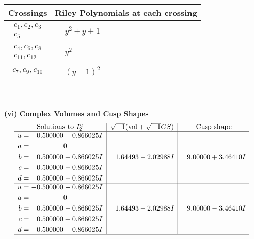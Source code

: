 \documentclass[1p]{elsarticle_modified}
\theoremstyle{definition}
\newcommand{\I}{\sqrt{-1}}
\begin{document}
\begin{tabular}{m{50pt}|m{274pt}}
Crossings & \hspace{64pt}Riley Polynomials at each crossing \\
\hline $$\begin{aligned}c_{1},c_{2},c_{3}\\c_{5}\end{aligned}$$&$\begin{aligned}
&y^2+y+1
\end{aligned}$\\
\hline $$\begin{aligned}c_{4},c_{6},c_{8}\\c_{11},c_{12}\end{aligned}$$&$\begin{aligned}
&y^2
\end{aligned}$\\
\hline $$\begin{aligned}c_{7},c_{9},c_{10}\end{aligned}$$&$\begin{aligned}
&(y-1)^2
\end{aligned}$\\
\hline
\end{tabular}\\~\\
\newpage\flushleft \textbf{(vi) Complex Volumes and Cusp Shapes}
$$\begin{array}{c|c|c}  
\text{Solutions to }I^u_{2}& \I (\text{vol} + \sqrt{-1}CS) & \text{Cusp shape}\\
 \hline 
\begin{aligned}
u &= -0.500000 + 0.866025 I \\
a &= \phantom{-0.000000 } 0 \\
b &= \phantom{-}0.500000 + 0.866025 I \\
c &= \phantom{-}0.500000 - 0.866025 I \\
d &= \phantom{-}0.500000 - 0.866025 I\end{aligned}
 & \phantom{-}1.64493 - 2.02988 I & \phantom{-}9.00000 + 3.46410 I \\ \hline\begin{aligned}
u &= -0.500000 - 0.866025 I \\
a &= \phantom{-0.000000 } 0 \\
b &= \phantom{-}0.500000 - 0.866025 I \\
c &= \phantom{-}0.500000 + 0.866025 I \\
d &= \phantom{-}0.500000 + 0.866025 I\end{aligned}
 & \phantom{-}1.64493 + 2.02988 I & \phantom{-}9.00000 - 3.46410 I\\
 \hline 
 \end{array}$$\newpage\newpage\renewcommand{\arraystretch}{1}
\end{document}
